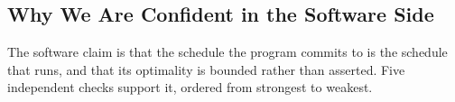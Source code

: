 

\subsection{Why We Are Confident in the Software Side}
\label{app:sw_confidence}

The software claim is that the schedule the program commits to is the schedule
that runs, and that its optimality is bounded rather than asserted. Five
independent checks support it, ordered from strongest to weakest.


